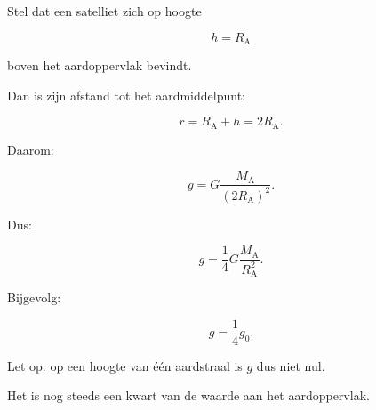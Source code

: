 \documentclass{ximera}
\begin{document}
\begin{voorbeeld}

Stel dat een satelliet zich op hoogte

\[
h=R_\mathrm A
\]

boven het aardoppervlak bevindt.

Dan is zijn afstand tot het aardmiddelpunt:

\[
r=R_\mathrm A+h
=
2R_\mathrm A.
\]

Daarom:

\[
g
=
G\frac{M_\mathrm A}{(2R_\mathrm A)^2}.
\]

Dus:

\[
g
=
\frac14
G\frac{M_\mathrm A}{R_\mathrm A^2}.
\]

Bijgevolg:

\[
\boxed{
g=\frac14g_0.
}
\]

Let op: op een hoogte van één aardstraal is $g$ dus niet nul.

Het is nog steeds een kwart van de waarde aan het aardoppervlak.

\end{voorbeeld}
\end{document}
